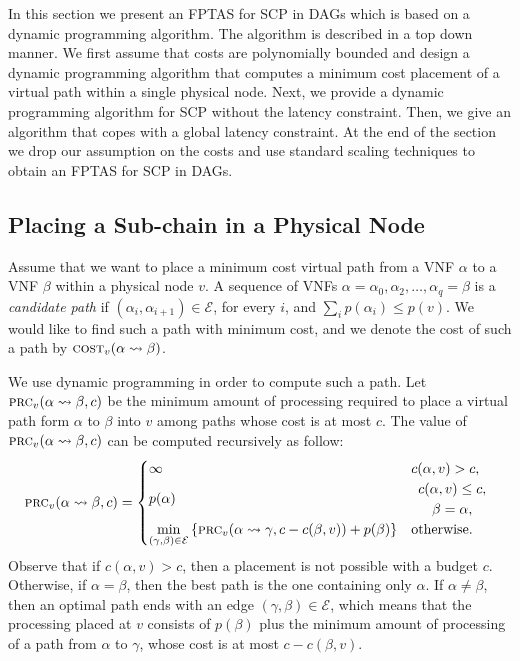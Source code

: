 \documentclass[runningheads]{llncs}
\newcommand{\set}[1]{\left\{ #1 \right\}}
\newcommand{\scp}{\textsc{SCP}\xspace}
\newcommand{\calE}{\mathcal{E}}
\newcommand{\cost}{\textsc{cost}\xspace}
\newcommand{\process}{\textsc{prc}\xspace}
\begin{document}
In this section we present an FPTAS for \scp in DAGs which is based on
a dynamic programming algorithm.
%
The algorithm is described in a top down manner.  We first assume that
costs are polynomially bounded and design a dynamic programming
algorithm that computes a minimum cost placement of a virtual path
within a single physical node.  Next, we provide a dynamic programming
algorithm for \scp without the latency constraint.  Then, we give an
algorithm that copes with a global latency constraint.  At the end of
the section we drop our assumption on the costs and use standard
scaling techniques to obtain an FPTAS for \scp in DAGs.


\subsection{Placing a Sub-chain in a Physical Node}

Assume that we want to place a minimum cost virtual path from a VNF
$\alpha$ to a VNF $\beta$ within a physical node $v$.  A sequence of
VNFs $\alpha = \alpha_0,\alpha_2,\ldots,\alpha_q = \beta$ is a
\emph{candidate path} if $(\alpha_i,\alpha_{i+1}) \in \calE$, for
every $i$, and $\sum_i p(\alpha_i) \leq p(v)$.  We would like to find
such a path with minimum cost, and we denote the cost of such a path
by $\cost_v(\alpha \leadsto \beta)$.

We use dynamic programming in order to compute such a path.  Let
$\process_v(\alpha \leadsto \beta,c)$ be the minimum amount of
processing required to place a virtual path form $\alpha$ to $\beta$
into $v$ among paths whose cost is at most $c$.
%
The value of $\process_v(\alpha \leadsto \beta,c)$ can be computed
recursively as follow:
\[
\process_v(\alpha \leadsto \beta, c) =
\begin{cases}
\infty    & c(\alpha,v) > c, \\
p(\alpha) &
\begin{array}{c}
c(\alpha,v) \leq c, \\
\beta = \alpha,
\end{array}
\\
\displaystyle
\min_{(\gamma,\beta) \in \calE}
   \set{\process_v(\alpha \leadsto \gamma, c - c(\beta,v)) + p(\beta)}
          & \text{otherwise}.
\end{cases}
\]
Observe that if $c(\alpha,v) > c$, then a placement is not possible
with a budget $c$.  Otherwise, if $\alpha = \beta$, then the best path
is the one containing only $\alpha$.  If $\alpha \neq \beta$, then an
optimal path ends with an edge $(\gamma,\beta) \in \calE$, which means
that the processing placed at $v$ consists of $p(\beta)$ plus the
minimum amount of processing of a path from $\alpha$ to $\gamma$,
whose cost is at most $c - c(\beta,v)$.
\end{document}
